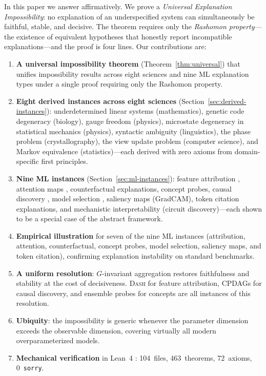 \documentclass[11pt,a4paper]{article}
\newcommand{\DASH}{\textsc{Dash}}
\begin{document}
In this paper we answer affirmatively.  We prove a \emph{Universal Explanation
Impossibility}: no explanation of an underspecified system can simultaneously
be faithful, stable, and decisive.  The theorem requires only the
\emph{Rashomon property}---the existence of equivalent hypotheses that
honestly report incompatible explanations---and the proof is four lines.
Our contributions are:
\begin{enumerate}[label=(\arabic*)]
  \item \textbf{A universal impossibility theorem}
    (Theorem~\ref{thm:universal}) that unifies impossibility results
    across eight sciences and nine ML explanation types under a single
    proof requiring only the Rashomon property.
  \item \textbf{Eight derived instances across eight sciences}
    (Section~\ref{sec:derived-instances}): underdetermined linear systems
    (mathematics), genetic code degeneracy (biology), gauge freedom
    (physics), microstate degeneracy in statistical mechanics (physics),
    syntactic ambiguity (linguistics), the phase problem
    (crystallography), the view update problem (computer science), and
    Markov equivalence (statistics)---each derived with zero axioms from
    domain-specific first principles.
  \item \textbf{Nine ML instances}
    (Section~\ref{sec:ml-instances}): feature attribution
    \citep{bilodeau2024impossibility}, attention maps
    \citep{jainwallace2019}, counterfactual explanations, concept probes,
    causal discovery \citep{verma1991equivalence}, model selection
    \citep{rudin2024amazing}, saliency maps (GradCAM), token citation explanations,
    and mechanistic interpretability (circuit
    discovery)---each shown to be a special case of the abstract framework.
  \item \textbf{Empirical illustration} for seven of the nine ML instances
    (attribution, attention, counterfactual, concept probes, model selection, saliency maps, and token citation),
    confirming explanation instability on standard benchmarks.
  \item \textbf{A uniform resolution}: $G$-invariant aggregation restores
    faithfulness and stability at the cost of decisiveness.  \DASH{} for
    feature attribution, CPDAGs for causal discovery, and ensemble probes
    for concepts are all instances of this resolution.
  \item \textbf{Ubiquity}: the impossibility is generic whenever the
    parameter dimension exceeds the observable dimension, covering
    virtually all modern overparameterized models.
  \item \textbf{Mechanical verification} in Lean~4
    \citep{demoura2021lean4}: 104~files, 463~theorems, 72~axioms,
    0~\texttt{sorry}.
\end{enumerate}
\end{document}

